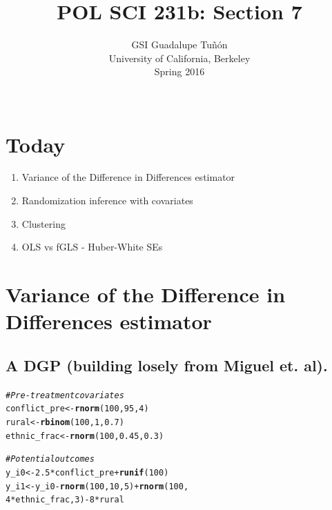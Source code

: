 \documentclass[12 pt]{article}\usepackage[]{graphicx}\usepackage[]{color}
\title {POL SCI 231b:  Section 7}
\author{GSI Guadalupe Tu\~n\'on\\University of California, Berkeley\\Spring 2016\\ ~\\ }
\date{}
\makeatletter
\newcommand{\hlnum}[1]{\textcolor[rgb]{0.686,0.059,0.569}{#1}}%
\newcommand{\hlcom}[1]{\textcolor[rgb]{0.678,0.584,0.686}{\textit{#1}}}%
\newcommand{\hlopt}[1]{\textcolor[rgb]{0,0,0}{#1}}%
\newcommand{\hlstd}[1]{\textcolor[rgb]{0.345,0.345,0.345}{#1}}%
\newcommand{\hlkwb}[1]{\textcolor[rgb]{0.69,0.353,0.396}{#1}}%
\newcommand{\hlkwd}[1]{\textcolor[rgb]{0.737,0.353,0.396}{\textbf{#1}}}%
\newenvironment{kframe}{%
 \def\at@end@of@kframe{}%
 \ifinner\ifhmode%
  \def\at@end@of@kframe{\end{minipage}}%
  \begin{minipage}{\columnwidth}%
 \fi\fi%
 \def\FrameCommand##1{\hskip\@totalleftmargin \hskip-\fboxsep
 \colorbox{shadecolor}{##1}\hskip-\fboxsep
     \hskip-\linewidth \hskip-\@totalleftmargin \hskip\columnwidth}%
 \MakeFramed {\advance\hsize-\width
   \@totalleftmargin\z@ \linewidth\hsize
   \@setminipage}}%
 {\par\unskip\endMakeFramed%
 \at@end@of@kframe}
\newenvironment{knitrout}{}{} %
\makeatother
\begin{document}
\maketitle

\singlespacing




\section*{Today}
\begin{enumerate}
\item Variance of the Difference in Differences estimator
\item Randomization inference with covariates
\item Clustering
\item OLS vs fGLS - Huber-White SEs
\end{enumerate}


\clearpage
\section*{Variance of the Difference in Differences estimator}

\subsection*{A DGP (building losely from Miguel et. al).}

\begin{knitrout}
\color{fgcolor}\begin{kframe}
\begin{alltt}
\hlcom{# Pre-treatment covariates}
\hlstd{conflict_pre} \hlkwb{<-} \hlkwd{rnorm}\hlstd{(}\hlnum{100}\hlstd{,} \hlnum{95}\hlstd{,} \hlnum{4}\hlstd{)}
\hlstd{rural} \hlkwb{<-} \hlkwd{rbinom}\hlstd{(}\hlnum{100}\hlstd{,} \hlnum{1}\hlstd{,} \hlnum{0.7}\hlstd{)}
\hlstd{ethnic_frac} \hlkwb{<-} \hlkwd{rnorm}\hlstd{(}\hlnum{100}\hlstd{,} \hlnum{0.45}\hlstd{,} \hlnum{0.3}\hlstd{)}

\hlcom{# Potential outcomes}
\hlstd{y_i0} \hlkwb{<-} \hlnum{2.5} \hlopt{*} \hlstd{conflict_pre} \hlopt{+} \hlkwd{runif}\hlstd{(}\hlnum{100}\hlstd{)}
\hlstd{y_i1} \hlkwb{<-} \hlstd{y_i0} \hlopt{-} \hlkwd{rnorm}\hlstd{(}\hlnum{100}\hlstd{,} \hlnum{10}\hlstd{,} \hlnum{5}\hlstd{)} \hlopt{+} \hlkwd{rnorm}\hlstd{(}\hlnum{100}\hlstd{,}
    \hlnum{4} \hlopt{*} \hlstd{ethnic_frac,} \hlnum{3}\hlstd{)} \hlopt{-} \hlnum{8} \hlopt{*} \hlstd{rural}
\end{alltt}
\end{kframe}
\end{knitrout}
\end{document}
